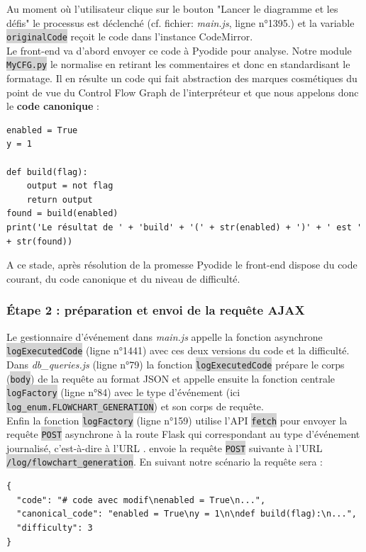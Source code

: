 \documentclass[11pt,a4paper]{article}
\newcommand{\code}[1]{\colorbox{lightgray}{\texttt{\small #1}}}
\newcommand{\filepath}[1]{\textit{#1}}
\begin{document}
Au moment où l'utilisateur clique sur le bouton "Lancer le diagramme et les défis" le processus est déclenché (cf. fichier: \filepath{main.js}, ligne n°1395.)  et la variable \code{originalCode} reçoit le code dans l'instance CodeMirror.\\
Le front-end va d'abord envoyer ce code à Pyodide pour analyse. Notre module \code{MyCFG.py} le normalise en retirant les commentaires et donc en standardisant le formatage. Il en résulte un code qui fait abstraction des marques cosmétiques du point de vue du Control Flow Graph de l'interpréteur et que nous appelons donc le \textbf{code canonique} :
\begin{verbatim}
enabled = True
y = 1

def build(flag):
    output = not flag
    return output
found = build(enabled)
print('Le résultat de ' + 'build' + '(' + str(enabled) + ')' + ' est ' + str(found))
\end{verbatim}
A ce stade, après résolution de la promesse Pyodide le front-end dispose du code courant, du code canonique et du niveau de difficulté.

\subsubsection*{Étape 2 : préparation et envoi de la requête AJAX}
Le gestionnaire d'événement dans \filepath{main.js} appelle la fonction asynchrone \code{logExecutedCode} (ligne n°1441) avec ces deux versions du code et la difficulté.\\
Dans \filepath{db\_queries.js} (ligne n°79) la fonction \code{logExecutedCode} prépare le corps (\code{body}) de la requête au format JSON et appelle ensuite la fonction centrale \code{logFactory} (ligne n°84) avec le type d'événement (ici \code{log\_enum.FLOWCHART\_GENERATION}) et son corps de requête.\\
Enfin la fonction \code{logFactory} (ligne n°159) utilise l'API \code{fetch} pour envoyer la requête \code{POST} asynchrone à la route Flask qui correspondant au type d'événement journalisé, c'est-à-dire à l'URL .
envoie la requête \code{POST} suivante à l'URL \code{/log/flowchart\_generation}. En suivant notre scénario la requête sera : 
\begin{verbatim}
{
  "code": "# code avec modif\nenabled = True\n...",
  "canonical_code": "enabled = True\ny = 1\n\ndef build(flag):\n...",
  "difficulty": 3
}
\end{verbatim}
\end{document}
